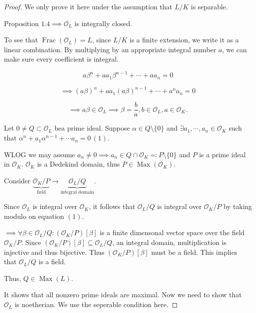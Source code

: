 \documentclass[openany]{amsbook}
\numberwithin{section}{chapter}
\theoremstyle{definition}
\newcommand{\Frac}{\operatorname{Frac}}
\begin{document}
\begin{proof}
    We only prove it here under the assumption that \(L / K\) is separable.

    Proposition \(1.4 \implies \mathcal{O}_L\) is integrally closed.

    To see that \(\Frac(\mathcal{O}_L) = L\), since \(L / K\) is a finite extension, we write it as a linear combination. By multiplying by an appropriate integral number \(a\), we can make sure every coefficient is integral.

    \[
        a \beta^n + a a_1 \beta^{n-1} + \cdots + a a_n = 0
    \]

    \[
        \implies (a \beta)^n + a a_1 (a \beta)^{n-1} + \cdots + a^n a_n = 0
    \]

    \[
        \implies a \beta \in \mathcal{O}_L \implies \beta = \frac{b}{a}, b\in \mathcal{O}_L, a \in \mathcal{O}_K.
    \]
    
    Let \(0 \neq Q \subset \mathcal{O}_L\) bea prime ideal. Suppose \(\alpha \in Q \setminus \{ 0 \}\) and \(\exists a_1, \cdots , a_n \in \mathcal{O}_K\) such that \(\alpha^n + a_1 \alpha^{n-1} + \cdots a_n = 0\,(1)\).

    WLOG we may assume \(a_n \neq 0 \implies a_n \in Q \cap \mathcal{O}_K \eqqcolon P \setminus \{ 0 \} \) and \(P\) is a prime ideal in \(\mathcal{O}_K\). \(\mathcal{O}_K\) is a Dedekind domain, thus \(P \in \operatorname{Max} (\mathcal{O}_K)\).

    Consider \(\underbrace{\mathcal{O}_K / P}_{\text{field}} \to \underbrace{\mathcal{O}_L / Q}_{\text{integral domain}}\). 
    
    Since \(\mathcal{O}_L\) is integral over \(\mathcal{O}_K\), it follows that \(\mathcal{O}_L / Q\) is integral over \(\mathcal{O}_K / P\) by taking modulo on equation \((1)\). 

    \(\implies \forall \beta \in \mathcal{O}_L / Q: (\mathcal{O}_K / P)[\beta]\) is a finite dimensonal vector space over the field \(\mathcal{O}_K / P\).  Since \((\mathcal{O}_K / P)[\beta] \subseteq \mathcal{O}_L / Q\), an integral domain, multiplication is injective and thus bijective. Thus \((\mathcal{O}_K / P)[\beta]\) must be a field. This implies that \(\mathcal{O}_L / Q\) is a field.

    Thus, \(Q\in \operatorname{Max}(L)\). 

    It shows that all nonzero prime ideals are maximal. Now we need to show that \(\mathcal{O}_L\) is noetherian. We use the seperable condition here.


\end{proof}
\end{document}
